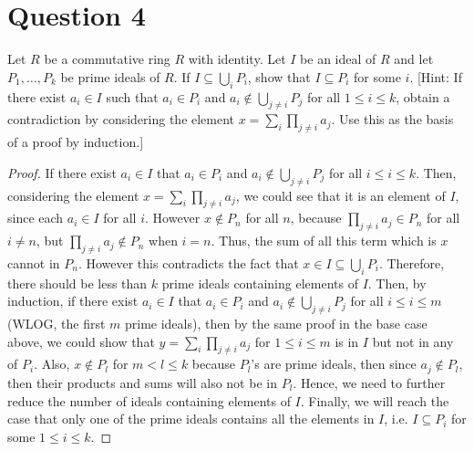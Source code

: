 \section{Question 4}

\begin{question}
    Let $R$ be a commutative ring $R$ with identity. Let $I$ be an ideal of $R$ and let $P_1, \ldots, P_k$ be prime ideals of $R$. If $I \subseteq \bigcup_i P_i$, show that $I \subseteq P_i$ for some $i$. [Hint: If there exist $a_i \in I$ such that $a_i \in P_i$ and $a_i \notin \bigcup_{j \neq i} P_j$ for all $1 \leq i \leq k$, obtain a contradiction by considering the element $x=\sum_i \prod_{j \neq i} a_j$. Use this as the basis of a proof by induction.]
\end{question}

\begin{answer}
    \begin{proof}
        If there exist $a_i \in I$ that $a_i \in P_i$ and $a_i \notin \bigcup_{j \neq i}P_j$ for all $i \leq i \leq k$. Then, considering the element $x=\sum_i \prod_{j \neq i} a_j$, we could see that it is an element of $I$, since each $a_i \in I$ for all $i$. However $x \notin P_n$ for all $n$, because $\prod_{j \neq i} a_j \in P_n$ for all $i \neq n$, but $\prod_{j \neq i} a_j \notin P_n$ when $i = n$. Thus, the sum of all this term which is $x$ cannot in $P_n$. However this contradicts the fact that $x \in I \subseteq \bigcup_i P_i$. Therefore, there should be less than $k$ prime ideals containing elements of $I$. Then, by induction, if there exist $a_i \in I$ that $a_i \in P_i$ and $a_i \notin \bigcup_{j \neq i}P_j$ for all $i \leq i \leq m$ (WLOG, the first $m$ prime ideals), then by the same proof in the base case above, we could show that $y = \sum_i \prod_{j \neq i} a_j$ for $1 \leq i \leq m$ is in $I$ but not in any of $P_i$. Also, $x \notin P_l$ for $m < l \leq k$ because $P_l$'s are prime ideals, then since $a_j \notin P_l$, then their products and sums will also not be in $P_l$. Hence, we need to further reduce the number of ideals containing elements of $I$. Finally, we will reach the case that only one of the prime ideals contains all the elements in $I$, i.e. $I \subseteq P_i$ for some $1 \leq i \leq k$.
    \end{proof}
\end{answer}